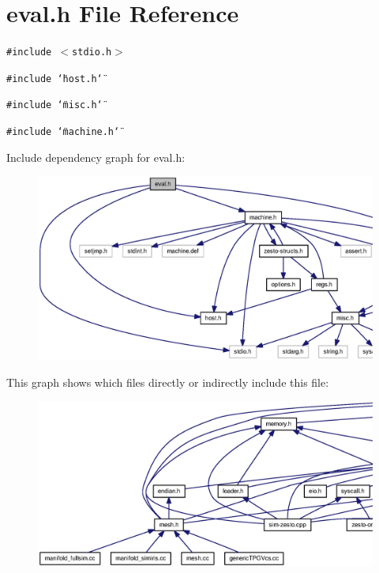 \section{eval.h File Reference}
\label{eval_8h}
{\tt \#include $<$stdio.h$>$}\par
{\tt \#include \char`\"{}host.h\char`\"{}}\par
{\tt \#include \char`\"{}misc.h\char`\"{}}\par
{\tt \#include \char`\"{}machine.h\char`\"{}}\par


Include dependency graph for eval.h:\nopagebreak
\begin{figure}[H]
\begin{center}
\leavevmode
\includegraphics[width=353pt]{eval_8h__incl}
\end{center}
\end{figure}


This graph shows which files directly or indirectly include this file:\nopagebreak
\begin{figure}[H]
\begin{center}
\leavevmode
\includegraphics[width=420pt]{eval_8h__dep__incl}
\end{center}
\end{figure}
